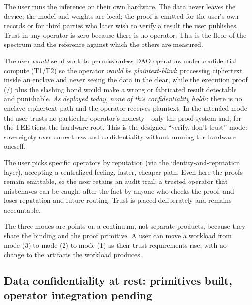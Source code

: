 \begin{description}[leftmargin=0pt,style=nextline]
\item[(1) User-operated node --- maximal sovereignty.] The user runs the inference on
their own hardware. The data never leaves the device; the model and weights are local;
the proof is emitted for the user's own records or for third parties who later wish to
verify a result the user publishes. Trust in any operator is zero because there is no
operator. This is the floor of the spectrum and the reference against which the others
are measured.
\item[(2) DAO trustless nodes --- verify, don't trust \emph{(unbuilt)}.] The user
\emph{would} send work to
permissionless DAO operators under confidential compute (T1/T2) so the operator
\emph{would be} \emph{plaintext-blind}: processing ciphertext inside an enclave and never
seeing the data in the clear, while the execution proof (\PoI{}/\PoT{}) plus the slashing
bond would make a wrong or fabricated result detectable and punishable. \emph{As
deployed today, none of this confidentiality holds}: there is no enclave ciphertext path
and the operator receives plaintext. In the intended mode the user trusts no
particular operator's honesty---only the proof system and, for the TEE tiers, the
hardware root. This is the designed ``verify, don't trust'' mode: sovereignty over
correctness and confidentiality without running the hardware oneself.
\item[(3) Selected trusted operators --- convenience.] The user picks specific
operators by reputation (via the identity-and-reputation layer), accepting a
centralized-feeling, faster, cheaper path. Even here the proofs remain emittable, so
the user retains an audit trail: a trusted operator that misbehaves can be caught
after the fact by anyone who checks the proof, and loses reputation and future
routing. Trust is placed deliberately and remains accountable.
\end{description}

The three modes are points on a continuum, not separate products, because they share
the binding and the proof primitive. A user can move a workload from mode (3) to
mode (2) to mode (1) as their trust requirements rise, with no change to the artifacts
the workload produces.

\subsection{Data confidentiality at rest: primitives built, operator integration pending}

